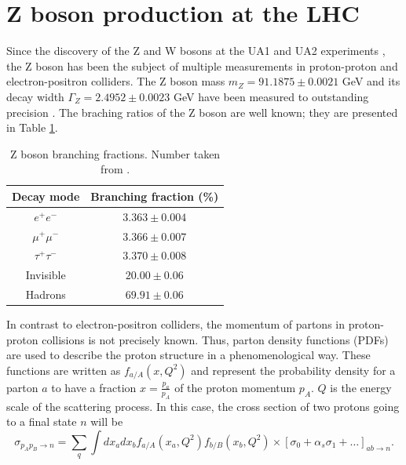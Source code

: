 \section{Z boson production at the LHC}\label{chap2sec0}
Since the discovery of the Z and W bosons at the UA1 and UA2 experiments \cite{Arnison:1983rp,Arnison:1983mk,Banner:1983jy,Bagnaia:1983zx}, the Z boson has been the subject of multiple measurements in proton-proton and electron-positron colliders. The Z boson mass $m_Z=91.1875\pm0.0021$ GeV and its decay width $\Gamma_Z=2.4952\pm0.0023$ GeV have been measured to outstanding precision \cite{ALEPH:2005ab}. The braching ratios of the Z boson are well known; they are presented in Table \ref{Table0}.
\begin{table}[]
	\centering
	\begin{tabular}{cc}
		\hline
		\multicolumn{1}{|c|}{Decay mode} & \multicolumn{1}{c|}{Branching fraction (\%)} \\ \hline
		$e^+e^-$                         & $3.363\pm0.004$                              \\
		$\mu^+\mu^-$                     & $3.366\pm0.007$                              \\
		$\tau^+\tau^-$                   & $3.370\pm0.008$                              \\
		Invisible                        & $20.00\pm0.06$                               \\
		Hadrons                          & $69.91\pm0.06$                               \\ \hline
	\end{tabular}
	\caption{Z boson branching fractions. Number taken from \cite{PhysRevD.98.030001}.}
	\label{Table0}
\end{table}
In contrast to electron-positron colliders, the momentum of partons in proton-proton collisions is not precisely known. Thus, parton density functions (PDFs) are used to describe the proton structure in a phenomenological way. These functions are written as $f_{a/A}(x,Q^2)$ and represent the probability density for a parton $a$ to have a fraction $x=\frac{p_a}{p_A}$ of the proton momentum $p_A$. $Q$ is the energy scale of the scattering process. In this case, the cross section of two protons going to a final state $n$ will be
\begin{equation}
	\sigma_{p_Ap_B\to n}=\sum_{q}\int dx_adx_b f_{a/A}(x_a,Q^2) f_{b/B}(x_b,Q^2)\times [\sigma_0+\alpha_s\sigma_1+\dots]_{ab\to n}.
\end{equation}
